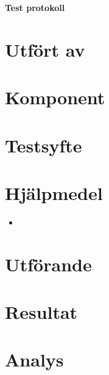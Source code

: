 \documentclass[a4paper]{article}
\begin{document}




\begin{center}
	\LARGE\textbf{Test protokoll}
\end{center}


\section*{Utfört av}
\label{sec:namndatum}



\section*{Komponent}
\label{sec:komponent}



\section*{Testsyfte}
\label{sec:testsyfte}



\section*{Hjälpmedel}
\label{sec:hjalpmedel}
\begin{itemize}
	\item 
\end{itemize}



\section*{Utförande}
\label{sec:utfarande}



\section*{Resultat}
\label{sec:resultat}



\section*{Analys}
\label{sec:analys}
\end{document}
